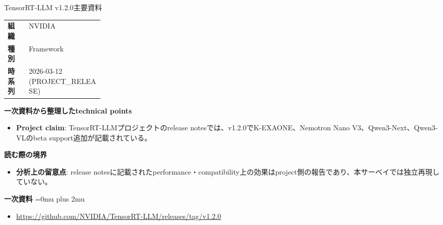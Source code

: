 \begin{technicalnote}{TensorRT-LLM v1.2.0}{主要資料}
\begingroup
\begin{tabularx}{\linewidth}{@{}>{\bfseries}p{0.22\linewidth}X@{}}
組織 & NVIDIA \\
種別 & Framework \\
時系列 & 2026-03-12 (PROJECT\_RELEASE) \\
\end{tabularx}
\smallskip
{\bfseries 一次資料から整理したtechnical points}
\begin{itemize}[leftmargin=1.5em,itemsep=0.35em]
\item \textbf{Project claim}: TensorRT-LLMプロジェクトのrelease notesでは、v1.2.0でK-EXAONE、Nemotron Nano V3、Qwen3-Next、Qwen3-VLのbeta support追加が記載されている。
\end{itemize}
\begin{minipage}{\linewidth}
{\bfseries 読む際の境界}
\begin{itemize}[leftmargin=1.5em,itemsep=0.35em]
\item \textbf{分析上の留意点}: release notesに記載されたperformance・compatibility上の効果はproject側の報告であり、本サーベイでは独立再現していない。
\end{itemize}
\begin{samepage}
{\bfseries 一次資料}
\begingroup\sloppy
\Urlmuskip=0mu plus 2mu\relax
\begin{itemize}[leftmargin=1.5em,itemsep=0.25em]
\item {\scriptsize\url{https://github.com/NVIDIA/TensorRT-LLM/releases/tag/v1.2.0}}
\end{itemize}
\endgroup
\end{samepage}
\end{minipage}
\endgroup
\end{technicalnote}
\medskip

